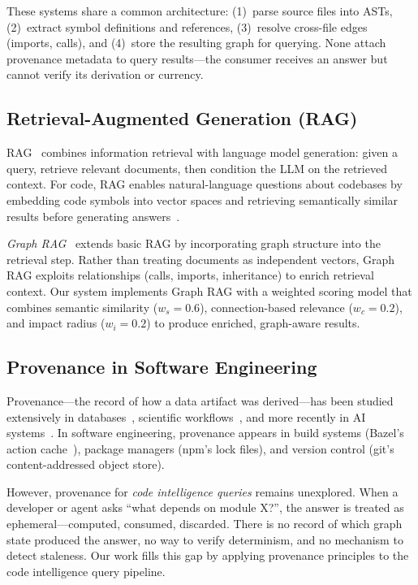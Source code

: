 \documentclass[conference]{IEEEtran}
\begin{document}
These systems share a common architecture: (1)~parse source files into
ASTs, (2)~extract symbol definitions and references, (3)~resolve
cross-file edges (imports, calls), and (4)~store the resulting graph
for querying. None attach provenance metadata to query results---the
consumer receives an answer but cannot verify its derivation or currency.

\subsection{Retrieval-Augmented Generation (RAG)}
\label{sec:background:rag}

RAG~\cite{Lewis2020} combines information retrieval with language model
generation: given a query, retrieve relevant documents, then condition
the LLM on the retrieved context. For code, RAG enables natural-language
questions about codebases by embedding code symbols into vector spaces
and retrieving semantically similar results before generating
answers~\cite{CodeRAG2024}.

\emph{Graph RAG}~\cite{Edge2024} extends basic RAG by incorporating
graph structure into the retrieval step. Rather than treating documents
as independent vectors, Graph RAG exploits relationships (calls,
imports, inheritance) to enrich retrieval context. Our system
implements Graph RAG with a weighted scoring model that combines
semantic similarity ($w_s = 0.6$), connection-based relevance
($w_c = 0.2$), and impact radius ($w_i = 0.2$) to produce enriched,
graph-aware results.

\subsection{Provenance in Software Engineering}
\label{sec:background:provenance}

Provenance---the record of how a data artifact was derived---has been
studied extensively in databases~\cite{Buneman2001,Cheney2009},
scientific workflows~\cite{Moreau2013}, and more recently in AI
systems~\cite{Herschel2017}. In software engineering, provenance
appears in build systems (Bazel's action
cache~\cite{Bazel2024}), package managers (npm's lock files), and
version control (git's content-addressed object store).

However, provenance for \emph{code intelligence queries} remains
unexplored. When a developer or agent asks ``what depends on module
X?'', the answer is treated as ephemeral---computed, consumed,
discarded. There is no record of which graph state produced the answer,
no way to verify determinism, and no mechanism to detect staleness. Our
work fills this gap by applying provenance principles to the code
intelligence query pipeline.
\end{document}
